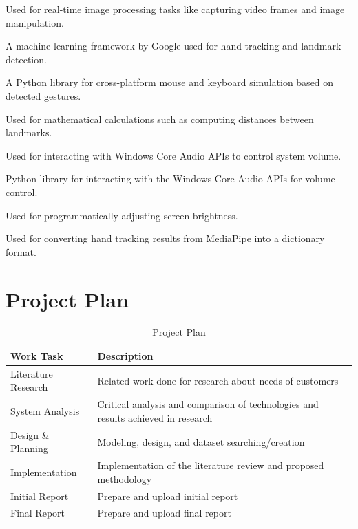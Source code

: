 \documentclass[12pt,a4paper]{report}
\begin{document}
\begin{description}[noitemsep, leftmargin=2cm]
  \item[\textbf{OpenCV (cv2)}] Used for real-time image processing tasks like capturing video
    frames and image manipulation.
  \item[\textbf{MediaPipe}] A machine learning framework by Google used for hand tracking and
    landmark detection.
  \item[\textbf{PyAutoGUI}] A Python library for cross-platform mouse and keyboard simulation
    based on detected gestures.
  \item[\textbf{Math Module}] Used for mathematical calculations such as computing distances
    between landmarks.
  \item[\textbf{ctypes / comtypes}] Used for interacting with Windows Core Audio APIs to
    control system volume.
  \item[\textbf{pycaw}] Python library for interacting with the Windows Core Audio APIs for
    volume control.
  \item[\textbf{screen\_brightness\_control}] Used for programmatically adjusting screen
    brightness.
  \item[\textbf{Google Protobuf}] Used for converting hand tracking results from MediaPipe
    into a dictionary format.
\end{description}

\section{Project Plan}

\begin{table}[ht]
\centering
\caption{Project Plan}
\begin{tabularx}{\textwidth}{lX}
\toprule
\textbf{Work Task} & \textbf{Description} \\
\midrule
Literature Research & Related work done for research about needs of customers \\
System Analysis     & Critical analysis and comparison of technologies and results achieved in research \\
Design \& Planning  & Modeling, design, and dataset searching/creation \\
Implementation      & Implementation of the literature review and proposed methodology \\
Initial Report      & Prepare and upload initial report \\
Final Report        & Prepare and upload final report \\
\bottomrule
\end{tabularx}
\end{table}
\end{document}
